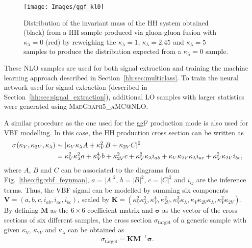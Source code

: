 \documentclass[../main.tex]{subfiles}
\begin{document}
\begin{figure}[h!]
\begin{center}
\texttt{[image: Images/ggf\_kl0]}
\end{center}
\caption[HH mass produced via ggF after reweighing]{Distribution of the invariant mass of the HH system obtained (black) from a HH sample produced via gluon-gluon fusion with $\kappa_\lambda=0$ (red) by reweighing the $\kappa_\lambda=1$, $\kappa_\lambda=2.45$ and $\kappa_\lambda=5$ samples to produce the distribution expected from a $\kappa_\lambda=0$ sample.}
\label{hh:fig:ggf_rew_test}
\end{figure}

These NLO samples are used for both signal extraction and training the machine learning approach described in Section~\ref{hh:sec:multiclass}. To train the neural network used for signal extraction (described in Section~\ref{hh:sec:signal_extraction}), additional LO samples with larger statistics were generated using \textsc{MadGraph5\_aMC@NLO}.

A similar procedure as the one used for the ggF production mode is also used for VBF modelling. In this case, the HH production cross section can be written as
\begin{align}
\sigma(\kappa_V, \kappa_{2V}, \kappa_\lambda) &\sim |\kappa_V\kappa_\lambda A + \kappa_V^2 B + \kappa_{2V} C| ^2 \notag\\
&= \kappa_V^2\kappa_\lambda^2 a + \kappa_V^4 b + \kappa_{2V}^2 c + \kappa_V^3\kappa_\lambda i_{ab} + \kappa_V\kappa_{2V}\kappa_\lambda i_{ac} + \kappa_V^2\kappa_{2V} i_{bc},
\end{align}
where $A$, $B$ and $C$ can be associated to the diagrams from Fig.~\ref{theo:fig:vbf_feynman}, $a = |A|^2$, $b = |B|^2$, $c = |C|^2$ and $i_{ij}$ are the inference terms. Thus, the VBF signal can be modelled by summing six components $\mathbf{V}=(a, b, c, i_{ab}, i_{ac}, i_{bc})$, scaled by $\mathbf{K}=(\kappa_V^2\kappa_\lambda^2, \kappa_V^4, \kappa_{2V}^2, \kappa_V^3\kappa_\lambda, \kappa_V\kappa_{2V}\kappa_\lambda,  \kappa_V^2\kappa_{2V})$. By defining $\mathbf{M}$ as the $6\times6$ coefficient matrix and $\mathbf{\sigma}$ as the vector of the cross sections of six different samples, the cross section $\sigma_\text{target}$ of a generic sample with given $\kappa_V$, $\kappa_{2V}$ and $\kappa_\lambda$ can be obtained as
\begin{equation}
\sigma_\text{target} = \mathbf{K}\mathbf{M}^{-1}\boldsymbol{\sigma}.
\end{equation}
\end{document}
